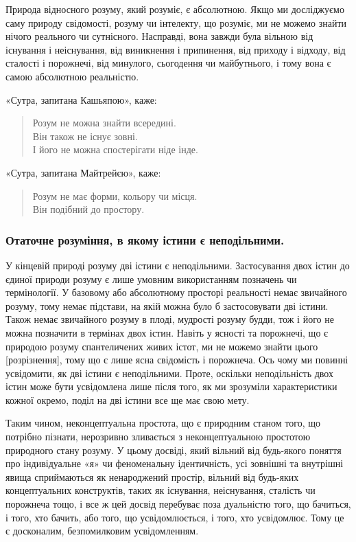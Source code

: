 \documentclass{article}
\begin{document}
Природа відносного розуму, який розуміє, є абсолютною.
Якщо ми досліджуємо саму природу свідомості, розуму чи інтелекту,
що розуміє, ми не можемо знайти нічого реального чи сутнісного.
Насправді, вона завжди була вільною від існування і неіснування,
від виникнення і припинення, від приходу і відходу, від сталості
і порожнечі, від минулого, сьогодення чи майбутнього,
і тому вона є самою абсолютною реальністю.

«Сутра, запитана Кашьяпою», каже:

\begin{verse}
        Розум не можна знайти всередині. \\
        Він також не існує зовні. \\
        І його не можна спостерігати ніде інде.
\end{verse}

«Сутра, запитана Майтрейєю», каже:

\begin{verse}
        Розум не має форми, кольору чи місця. \\
        Він подібний до простору.
\end{verse}

\subsubsection{Отаточне розуміння, в якому істини є неподільними.}

У кінцевій природі розуму дві істини є неподільними. Застосування двох істин до єдиної природи розуму є лише умовним використанням позначень чи термінології. У базовому або абсолютному просторі реальності немає звичайного розуму, тому немає підстави, на якій можна було б застосовувати дві істини. Також немає звичайного розуму в плоді, мудрості розуму будди, тож і його не можна позначити в термінах двох істин. Навіть у ясності та порожнечі, що є природою розуму спантеличених живих істот, ми не можемо знайти цього [розрізнення], тому що є лише ясна свідомість і порожнеча. Ось чому ми повинні усвідомити, як дві істини є неподільними.
Проте, оскільки неподільність двох істин може бути усвідомлена лише після того, як ми зрозуміли характеристики кожної окремо, поділ на дві істини все ще має свою мету.

Таким чином, неконцептуальна простота, що є природним станом того, що потрібно пізнати, нерозривно зливається з неконцептуальною простотою природного стану розуму. У цьому досвіді, який вільний від будь-якого поняття про індивідуальне «я» чи феноменальну ідентичність, усі зовнішні та внутрішні явища сприймаються як ненароджений простір, вільний від будь-яких концептуальних конструктів, таких як існування, неіснування, сталість чи порожнеча тощо, і все ж цей досвід перебуває поза дуальністю того, що бачиться, і того, хто бачить, або того, що усвідомлюється, і того, хто усвідомлює. Тому це є досконалим, безпомилковим усвідомленням.
\end{document}
